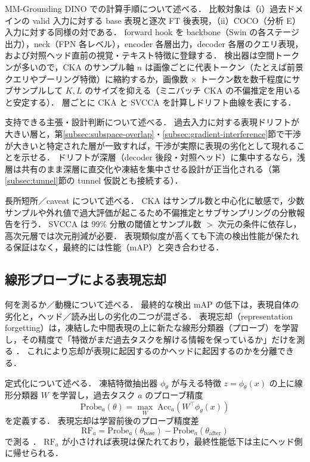 MM-Grounding DINO での計算手順について述べる．
比較対象は（i）過去ドメインの valid 入力に対する base 表現と逐次 FT 後表現，（ii）COCO（分析 E）入力に対する同様の対である．
forward hook を backbone（Swin の各ステージ出力），neck（FPN 各レベル），encoder 各層出力，decoder 各層のクエリ表現，および対照ヘッド直前の視覚・テキスト特徴に登録する．
検出器は空間トークンが多いので，CKA のサンプル軸 $n$ は画像ごとに代表トークン（たとえば前景クエリやプーリング特徴）に縮約するか，画像数 $\times$ トークン数を数千程度にサブサンプルして $K, L$ のサイズを抑える（ミニバッチ CKA の不偏推定を用いると安定する）．
層ごとに CKA と SVCCA を計算しドリフト曲線を表にする．

支持できる主張・設計判断について述べる．
過去入力に対する表現ドリフトが大きい層と，第\ref{subsec:subspace-overlap}・\ref{subsec:gradient-interference}節で干渉が大きいと特定された層が一致すれば，干渉が実際に表現の劣化として現れることを示せる．
ドリフトが深層（decoder 後段・対照ヘッド）に集中するなら，浅層は共有のまま深層に直交化や凍結を集中させる設計が正当化される（第\ref{subsec:tunnel}節の tunnel 仮説とも接続する）．

長所短所／caveat について述べる．
CKA はサンプル数と中心化に敏感で，少数サンプルや外れ値で過大評価が起こるため不偏推定とサブサンプリングの分散報告を行う．
SVCCA は $99\%$ 分散の閾値とサンプル数 $>$ 次元の条件に依存し，高次元層では次元削減が必要．
表現類似度が高くても下流の検出性能が保たれる保証はなく，最終的には性能（mAP）と突き合わせる．


\subsection{線形プローブによる表現忘却}
\label{subsec:linear-probe}

何を測るか／動機について述べる．
最終的な検出 mAP の低下は，表現自体の劣化と，ヘッド／読み出しの劣化の二つが混ざる．
表現忘却（representation forgetting）は，凍結した中間表現の上に新たな線形分類器（プローブ）を学習し，その精度で「特徴がまだ過去タスクを解ける情報を保っているか」だけを測る \cite{probingrf}．
これにより忘却が表現に起因するのかヘッドに起因するのかを分離できる．

定式化について述べる．
凍結特徴抽出器 $\phi_\theta$ が与える特徴 $z = \phi_\theta(x)$ の上に線形分類器 $W$ を学習し，過去タスク $a$ のプローブ精度
\begin{equation}
\mathrm{Probe}_a(\theta) = \max_{W}\; \mathrm{Acc}_a\!\left( W^{\top} \phi_\theta(x) \right)
\end{equation}
を定義する．
表現忘却は学習前後のプローブ精度差
\begin{equation}
\mathrm{RF}_a = \mathrm{Probe}_a(\theta_{\mathrm{base}}) - \mathrm{Probe}_a(\theta_{\mathrm{after}})
\end{equation}
で測る \cite{probingrf}．
$\mathrm{RF}_a$ が小さければ表現は保たれており，最終性能低下は主にヘッド側に帰せられる．

